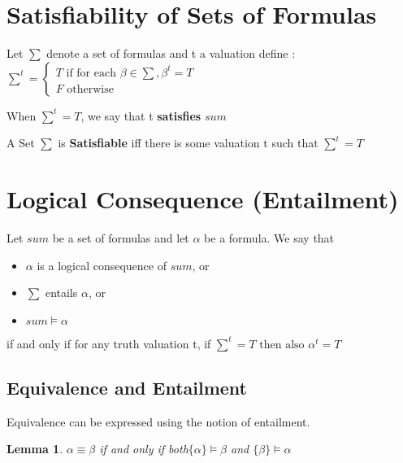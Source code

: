 \documentclass{article}
\newtheorem{lemma}[theorem]{Lemma}
\begin{document}
\section{Satisfiability of Sets of Formulas}
Let \(\sum\) denote a set of formulas and t a valuation define : \(\sum^t = \begin{cases} T    \text{     if for each } \beta \in \sum, \beta^t = T \\F \text{     otherwise }\end{cases}\)

When \(\sum^t = T\), we say that t \textbf{satisfies} \(sum\)

A Set \(\sum\) is \textbf{Satisfiable} iff there is some valuation t such that \(\sum^t = T\)

\section{Logical Consequence (Entailment)}
Let \(sum\) be a set of formulas and let \(\alpha\) be a formula. We say that 
\begin{itemize}
\item \(\alpha\) is a logical consequence of \(sum\), or 
\item \(\sum\) entails \(\alpha\), or 
\item \(sum \models \alpha\) 
\end{itemize}

if and only if for any truth valuation t, if \(\sum^t = T \text{ then also } \alpha^t = T\)

\subsection{Equivalence and Entailment}
Equivalence can be expressed using the notion of entailment.

\begin{lemma} \(\alpha \equiv \beta\) if and only if both\(\{ \alpha \} \models \beta\) and \(\{\beta\} \models \alpha \)
\end{lemma}
\end{document}
